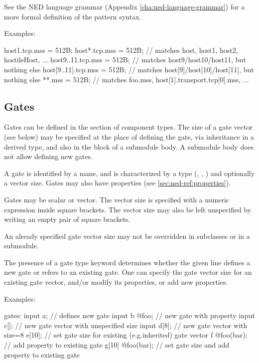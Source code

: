 See the NED language grammar (Appendix \ref{cha:ned-language-grammar})
for a more formal definition of the pattern syntax.

Examples:
\begin{ned}
host1.tcp.mss = 512B;
host*.tcp.mss = 512B; // matches host, host1, host2, hostileHost, ...
host{9..11}.tcp.mss = 512B; // matches host9/host10/host11, but nothing else
host[9..11].tcp.mss = 512B; // matches host[9]/host[10]/host[11], but nothing else
**.mss = 512B; // matches foo.mss, host[1].transport.tcp[0].mss, ...
\end{ned}



\subsection{Gates}
\label{sec:ned-ref:gates}

Gates can be defined in the  section of component types.
The size of a gate vector (see below) may be specified at the place of
defining the gate, via inheritance in a derived type, and also in the
 block of a submodule body. A submodule body does not allow
defining new gates.

A gate is identified by a name, and is characterized by a type
(, , ) and optionally a
vector size. Gates may also have properties (see
\ref{sec:ned-ref:properties}).

Gates may be scalar or vector. The vector size is specified with a numeric
expression inside square brackets. The vector size may also be left
unspecified by writing an empty pair of square brackets.

An already specified gate vector size may not be overridden in subclasses or
in a submodule.

The presence of a gate type keyword determines whether the given line defines
a new gate or refers to an existing gate. One can specify the gate vector
size for an existing gate vector, and/or modify its properties, or add new
properties.

Examples:

\begin{ned}
gates:
  input a;         // defines new gate
  input b @foo;    // new gate with property
  input c[];       // new gate vector with unspecified size
  input d[8];      // new gate vector with size=8
  e[10];           // set gate size for existing (e.g.inherited) gate vector
  f @foo(bar);     // add property to existing gate
  g[10] @foo(bar); // set gate size and add property to existing gate
\end{ned}

